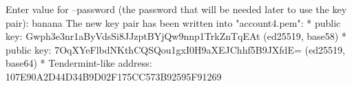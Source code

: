 \begin{shellbox}\begin{ttlst}
Enter value for --password (the password that will be needed later to use the key pair): banana
The new key pair has been written into "account4.pem":
* public key: Gwph3e3nr1aByVdsSi8JJzptBYjQw9nnp1TrkZnTqEAt (ed25519, base58)
* public key: 7OqXYeFlbdNKthCQSQou1gxI0H9aXEJChhf5B9JXfdE= (ed25519, base64)
* Tendermint-like address: 107E90A2D44D34B9D02F175CC573B92595F91269
\end{ttlst}\end{shellbox}
